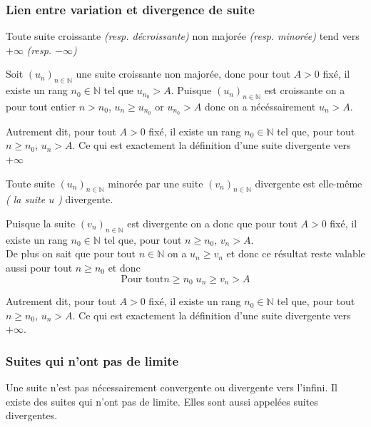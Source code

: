 \documentclass[french]{book}
\newcommand{\N}{\mathbb {N}}
\newcommand{\se}{\geq}
\newcommand{\suite}[1][u]{\left( #1_{n} \right)_{n\in\N}}
\begin{document}
\subsubsection{Lien entre variation et divergence de suite}
\begin{thm} 
Toute suite croissante \emph{(resp. décroissante)} non majorée \emph{(resp. minorée)} tend vers $+ \infty $ \emph{(resp. $-\infty$)}
\end{thm}

\begin{demo}
Soit $\suite[u]$ une suite croissante non majorée, donc pour tout $A>0$ fixé, il existe un rang $n_0 \in \mathbb{N}$ tel que $u_{n_0}>A$. Puisque $\suite[u]$ est croissante on a pour tout entier $n>n_0$, $u_n \se u_{n_0}$ or $u_{n_0}>A$ donc on a nécéssairement $u_n > A$. 

Autrement dit, pour tout $A>0$ fixé, il existe un rang $n_0 \in \mathbb{N}$ tel que, pour tout $n\se n_0$, $u_n>A$. Ce qui est exactement la définition d'une suite divergente vers $+ \infty$

\end{demo}

\begin{thm} 
Toute suite $\suite[u]$ minorée par une suite $\suite[v]$ divergente est elle-même \emph{( la suite $u$ ) } divergente.
\end{thm}

\begin{demo}
Puisque la suite $\suite[v]$ est divergente on a donc que pour tout $A>0$ fixé, il existe un rang $n_0 \in \mathbb{N}$ tel que, pour tout $n\se n_0$, $v_n>A$. \\

De plus on sait que pour tout $n \in \mathbb{N}$ on a $u_n \se v_n$ et donc ce résultat reste valable aussi pour tout $n\se n_0$ et donc 
$$\text{Pour tout} n\se n_0\;  u_n \se v_n > A $$

Autrement dit, pour tout $A>0$ fixé, il existe un rang $n_0 \in \mathbb{N}$ tel que, pour tout $n\se n_0$, $u_n>A$. Ce qui est exactement la définition d'une suite divergente vers $+ \infty$.

\end{demo}

\subsubsection*{Suites qui n'ont pas de limite}
Une suite n'est pas nécessairement convergente ou divergente vers l'infini. Il existe des suites qui n'ont pas de limite. Elles sont aussi appelées suites divergentes.
\end{document}
